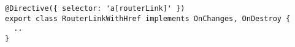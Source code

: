 \begin{verbatim}
@Directive({ selector: 'a[routerLink]' })
export class RouterLinkWithHref implements OnChanges, OnDestroy {
  ..
}
\end{verbatim}
